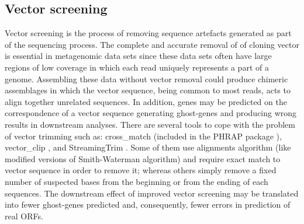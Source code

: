 \subsection*{Vector screening}
Vector screening is the process of removing sequence artefacts generated as part of the sequencing process. The complete and accurate removal of of cloning vector is essential in metagenomic data sets since these data sets often have large regions of low coverage in which each read uniquely represents a part of a genome. Assembling these data without vector removal could produce chimeric assemblages in which the vector sequence, being common to most reads, acts to align together unrelated sequences. In addition, genes may be predicted on the correspondence of a vector sequence generating ghost-genes and producing wrong results in downstream analyses. There are several tools to cope with the problem of vector trimming such as: cross_match (included in the PHRAP package \cite{bastide2007assembling}), vector_clip \cite{staden1999staden}, and StreamingTrim \cite{bacci2014streamingtrim}. Some of them use alignments algorithm (like modified versions of Smith-Waterman algorithm) and require exact match to vector sequence in order to remove it; whereas others simply remove a fixed number of suspected bases from the beginning or from the ending of each sequences. The downstream effect of improved vector screening may be translated into fewer ghost-genes predicted and, consequently, fewer errors in prediction of real ORFs.\\

\backmatter
{}
\renewcommand{\sectionmark}[1]{\markright{#1}}
\sectionmark{Bibliography}
